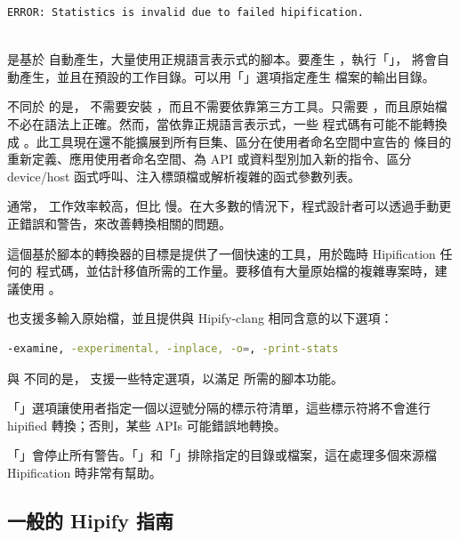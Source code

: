 \begin{lstlisting}[language=bash]
ERROR: Statistics is invalid due to failed hipification.
\end{lstlisting} 
\\  是基於  自動產生，大量使用正規語言表示式的腳本。要產生 ，執行「」， 將會自動產生，並且在預設的工作目錄。可以用「」選項指定產生  檔案的輸出目錄。

不同於  的是， 不需要安裝 ，而且不需要依靠第三方工具。只需要 ，而且原始檔不必在語法上正確。然而，當依靠正規語言表示式，一些  程式碼有可能不能轉換成 。此工具現在還不能擴展到所有巨集、區分在使用者命名空間中宣告的  條目的重新定義、應用使用者命名空間、為 API 或資料型別加入新的指令、區分 device/host 函式呼叫、注入標頭檔或解析複雜的函式參數列表。

通常， 工作效率較高，但比  慢。在大多數的情況下，程式設計者可以透過手動更正錯誤和警告，來改善轉換相關的問題。

這個基於腳本的轉換器的目標是提供了一個快速的工具，用於臨時 Hipification 任何的  程式碼，並估計移值所需的工作量。要移值有大量原始檔的複雜專案時，建議使用 。

 也支援多輸入原始檔，並且提供與 Hipify-clang 相同含意的以下選項：

\begin{lstlisting}[language=bash]
-examine, -experimental, -inplace, -o=, -print-stats
\end{lstlisting}

與  不同的是， 支援一些特定選項，以滿足  所需的腳本功能。

「」選項讓使用者指定一個以逗號分隔的標示符清單，這些標示符將不會進行 hipified 轉換；否則，某些 APIs 可能錯誤地轉換。

「」會停止所有警告。「」和「」排除指定的目錄或檔案，這在處理多個來源檔 Hipification 時非常有幫助。

\subsection{一般的 Hipify 指南}


